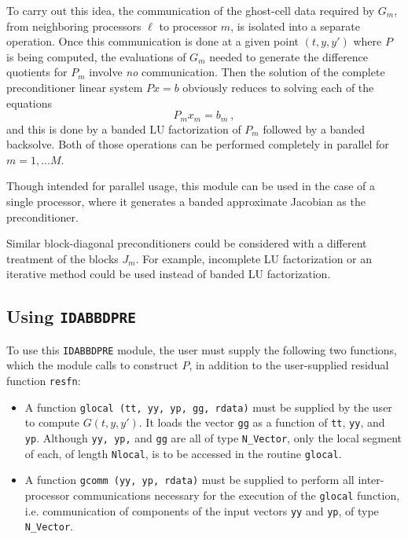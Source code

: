 \documentclass[11pt]{article}
\begin{document}
To carry out this idea, the communication of the ghost-cell data
required by $G_m$, from neighboring processors $\ell$ to processor
$m$, is isolated into a separate operation.  Once this communication
is done at a given point $(t,y,y')$ where $P$ is being computed, the
evaluations of $G_m$ needed to generate the difference quotients for
$P_m$ involve {\em no} communication.  Then the solution of the
complete preconditioner linear system $Px = b$ obviously reduces to
solving each of the equations
\begin{equation}
P_m x_m = b_m ~,   \label{pblocksys}
\end{equation}
and this is done by a banded LU factorization of $P_m$ followed by a
banded backsolve.  Both of those operations can be performed
completely in parallel for $m = 1, \ldots M$.

Though intended for parallel usage, this module can be used in the
case of a single processor, where it generates a banded approximate
Jacobian as the preconditioner.

Similar block-diagonal preconditioners could be considered with a
different treatment of the blocks $J_m$.  For example, incomplete LU
factorization or an iterative method could be used instead of banded
LU factorization.


\subsection{Using {\tt IDABBDPRE}}

To use this {\tt IDABBDPRE} module, the user must supply the following
two functions, which the module calls to construct $P$, in addition to
the user-supplied residual function {\tt resfn}:

\begin{itemize}

\item A function {\tt glocal (tt, yy, yp, gg, rdata)} must be supplied
by the user to compute $G(t,y,y')$.  It loads the vector {\tt gg} as
a function of {\tt tt}, {\tt yy}, and {\tt yp}.  Although 
{\tt yy, yp,} and {\tt gg} are all of type {\tt N\_Vector}, only the
local segment of each, of length {\tt Nlocal}, is to be accessed in
the routine {\tt glocal}.

\item  A function {\tt gcomm (yy, yp, rdata)} must be supplied to
perform all inter-processor communications necessary for the execution
of the {\tt glocal} function, i.e. communication of components of the
input vectors {\tt yy} and {\tt yp}, of type {\tt N\_Vector}.

\end{itemize}
\end{document}
